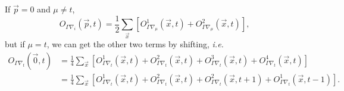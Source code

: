 \documentclass[10pt]{article}
\begin{document}
If $\vec{p}=0$ and $\mu \neq t$,
\begin{equation}
    O_{\Gamma \nabla_{i}}(\vec{p}, t) = \frac{1}{2} \sum_{\vec{x}} \left[ O_{\Gamma \nabla_{\mu}}^1(\vec{x}, t) + O_{\Gamma \nabla_{\mu}}^2(\vec{x}, t) \right],
\end{equation}
but if $\mu = t$, we can get the other two terms by shifting, \textit{i.e.}
\begin{equation}
\begin{aligned}
    O_{\Gamma \nabla_{t}}(\vec{0}, t) &= \frac{1}{4} \sum_{\vec{x}} \left[ O_{\Gamma \nabla_{t}}^1(\vec{x}, t) + O_{\Gamma \nabla_{t}}^2(\vec{x}, t) + O_{\Gamma \nabla_{t}}^3(\vec{x}, t) + O_{\Gamma \nabla_{t}}^4(\vec{x}, t) \right] \\
    &= \frac{1}{4} \sum_{\vec{x}} \left[ O_{\Gamma \nabla_{t}}^1(\vec{x}, t) + O_{\Gamma \nabla_{t}}^2(\vec{x}, t) + O_{\Gamma \nabla_{t}}^2(\vec{x}, t+1) + O_{\Gamma \nabla_{t}}^1(\vec{x}, t-1) \right]. \\
\end{aligned}
\end{equation}
\end{document}
